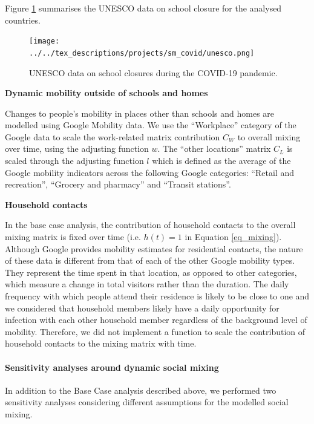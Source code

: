Figure \ref{fig:unesco} summarises the UNESCO data on school closure for the analysed countries.

\begin{figure}[p]
  \begin{center}
  \texttt{[image: ../../tex\_descriptions/projects/sm\_covid/unesco.png]}
  \end{center}
  \caption{UNESCO data on school closures during the COVID-19 pandemic.
  } 
  \label{fig:unesco}
\end{figure}

\vspace{5pt}
\textbf{Dynamic mobility outside of schools and homes}

Changes to people's mobility in places other than schools and homes are modelled using Google Mobility data. We use the ``Workplace''
category of the Google data to scale the work-related matrix contribution $C_W$ to overall mixing over time, using the adjusting function
$w$. The ``other locations'' matrix $C_L$ is scaled through the adjusting function $l$ which is defined as the average of the Google mobility
indicators across the following Google categories: ``Retail and recreation'', ``Grocery and pharmacy'' and ``Transit stations''.

\vspace{5pt}
\textbf{Household contacts}

In the base case analysis, the contribution of household contacts to the overall mixing matrix is fixed over time 
(i.e. $h(t) = 1$ in Equation \ref{eq_mixing}). Although Google provides mobility 
estimates for residential contacts, the nature of these data is different from that of each of the other Google mobility 
types. They represent the time spent in that location, as opposed to other categories, which measure a change in total visitors 
rather than the duration. The daily frequency with which people attend their residence is likely to be close to one and we 
considered that household members likely have a daily opportunity for infection with each other household member regardless of
the background level of mobility. Therefore, we did not implement a function to scale the contribution of household contacts 
to the mixing matrix with time.

\paragraph{Sensitivity analyses around dynamic social mixing}
In addition to the Base Case analysis described above, we performed two sensitivity analyses considering
different assumptions for the modelled social mixing.

